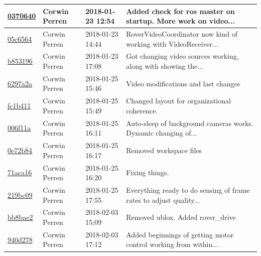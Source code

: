 \begin{center}
\begin{tabular}{l l l l}
\href{https://github.com/OSURoboticsClub/Rover_2017_2018/commit/03706408d374a025982071ab5414694a2742d8ca}{0370640} & Corwin Perren & 2018-01-23 12:54 &Added check for ros master on startup. More work on video...\\\hline
\href{https://github.com/OSURoboticsClub/Rover_2017_2018/commit/05c65645e9c4a87a6571797f7dd8680858f095f2}{05c6564} & Corwin Perren & 2018-01-23 14:44 &RoverVideoCoordinator now kind of working with VideoReceiver...\\\hline
\href{https://github.com/OSURoboticsClub/Rover_2017_2018/commit/b85319665e7fa439f4834266e504547d630671eb}{b853196} & Corwin Perren & 2018-01-23 17:08 &Got changing video sources working, along with showing the...\\\hline
\href{https://github.com/OSURoboticsClub/Rover_2017_2018/commit/6297a2af444c42c48861fc4852042402748274e5}{6297a2a} & Corwin Perren & 2018-01-25 15:46 &Video modifications and last changes\\\hline
\href{https://github.com/OSURoboticsClub/Rover_2017_2018/commit/fc1b41178cea41bbf1d846e0178cee1cd1d800f9}{fc1b411} & Corwin Perren & 2018-01-25 15:49 &Changed layout for organizational coherence.\\\hline
\href{https://github.com/OSURoboticsClub/Rover_2017_2018/commit/006f11af653ba82b0984a2de92f99dc3f240cdd0}{006f11a} & Corwin Perren & 2018-01-25 16:11 &Auto-sleep of background cameras works. Dynamic changing of...\\\hline
\href{https://github.com/OSURoboticsClub/Rover_2017_2018/commit/0e72b84a930ab4a58539d535a9a177c3a0cb9f8b}{0e72b84} & Corwin Perren & 2018-01-25 16:17 &Removed workspace files\\\hline
\href{https://github.com/OSURoboticsClub/Rover_2017_2018/commit/71aca163d60f6ea6bacbde141f42a9d693305c5d}{71aca16} & Corwin Perren & 2018-01-25 16:20 &Fixing things.\\\hline
\href{https://github.com/OSURoboticsClub/Rover_2017_2018/commit/219bc0956cbec27066b3f25de0edcc7397a7ef12}{219bc09} & Corwin Perren & 2018-01-25 17:55 &Everything ready to do sensing of frame rates to adjust quality...\\\hline
\href{https://github.com/OSURoboticsClub/Rover_2017_2018/commit/bb8bae2f55caca5f45d0ed77e9ab8ad933ccb8fc}{bb8bae2} & Corwin Perren & 2018-02-03 15:09 &Removed ublox. Added rover\_drive\\\hline
\href{https://github.com/OSURoboticsClub/Rover_2017_2018/commit/940d2782c361acee060488d8b07636eb3fc2eb7f}{940d278} & Corwin Perren & 2018-02-03 17:12 &Added beginnings of getting motor control working from within...\\\hline

\end{tabular}
\end{center}
